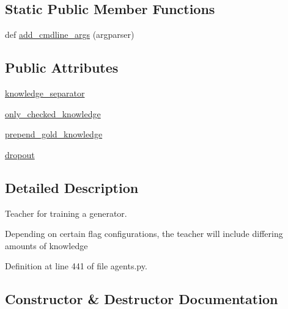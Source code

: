 \subsection*{Static Public Member Functions}
\begin{DoxyCompactItemize}
\item 
def \hyperlink{classparlai_1_1tasks_1_1wizard__of__wikipedia_1_1agents_1_1GeneratorTeacher_ae23cc01ce296734fbb1d23d8cb3ca81f}{add\+\_\+cmdline\+\_\+args} (argparser)
\end{DoxyCompactItemize}
\subsection*{Public Attributes}
\begin{DoxyCompactItemize}
\item 
\hyperlink{classparlai_1_1tasks_1_1wizard__of__wikipedia_1_1agents_1_1GeneratorTeacher_a4447c8875dd9f65e3d17ba2aec12d616}{knowledge\+\_\+separator}
\item 
\hyperlink{classparlai_1_1tasks_1_1wizard__of__wikipedia_1_1agents_1_1GeneratorTeacher_aafed07e065901daac67457e406e5dec0}{only\+\_\+checked\+\_\+knowledge}
\item 
\hyperlink{classparlai_1_1tasks_1_1wizard__of__wikipedia_1_1agents_1_1GeneratorTeacher_a83ff7bb3c705386f3b4e9ae07c0d04fe}{prepend\+\_\+gold\+\_\+knowledge}
\item 
\hyperlink{classparlai_1_1tasks_1_1wizard__of__wikipedia_1_1agents_1_1GeneratorTeacher_ab274137e75e9f6c5018376b4c61cdd32}{dropout}
\end{DoxyCompactItemize}


\subsection{Detailed Description}
\begin{DoxyVerb}Teacher for training a generator.

Depending on certain flag configurations, the teacher will include differing amounts
of knowledge
\end{DoxyVerb}
 

Definition at line 441 of file agents.\+py.



\subsection{Constructor \& Destructor Documentation}
\mbox{\label{classparlai_1_1tasks_1_1wizard__of__wikipedia_1_1agents_1_1GeneratorTeacher_aebced34e7b98c204d1215e5898d16c8a}} 
